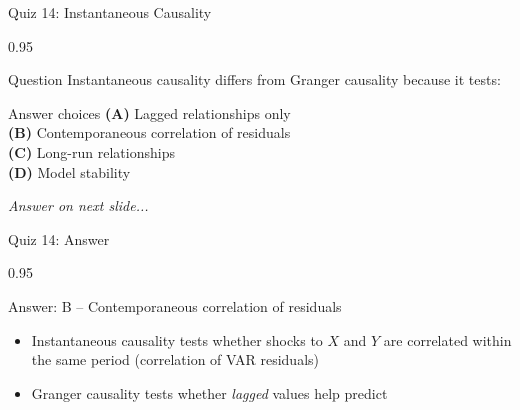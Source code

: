 \documentclass[9pt, aspectratio=169, t]{beamer}
\begin{document}
\begin{frame}{Quiz 14: Instantaneous Causality}
    \begin{cminipage}{0.95\textwidth}
    \begin{alertblock}{Question}
        Instantaneous causality differs from Granger causality because it tests:
    \end{alertblock}

    \vspace{0.4cm}

    \begin{block}{Answer choices}
        \textcolor{MainBlue}{\textbf{(A)}} Lagged relationships only\\[3pt]
        \textcolor{MainBlue}{\textbf{(B)}} Contemporaneous correlation of residuals\\[3pt]
        \textcolor{MainBlue}{\textbf{(C)}} Long-run relationships\\[3pt]
        \textcolor{MainBlue}{\textbf{(D)}} Model stability
    \end{block}

    \vspace{0.5cm}

    \begin{center}
        \textit{Answer on next slide...}
    \end{center}
    \end{cminipage}
\end{frame}

\begin{frame}{Quiz 14: Answer}
    \begin{cminipage}{0.95\textwidth}
    \begin{exampleblock}{Answer: B -- Contemporaneous correlation of residuals}
        \begin{itemize}
            \item Instantaneous causality tests whether shocks to $X$ and $Y$ are correlated within the same period (correlation of VAR residuals)
            \item Granger causality tests whether \textit{lagged} values help predict
        \end{itemize}
    \end{exampleblock}

    \end{cminipage}
\end{frame}

\end{document}
